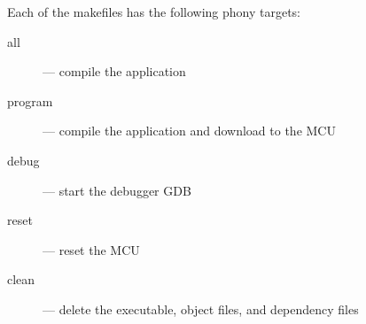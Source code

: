 Each of the makefiles has the following phony targets:
%
\begin{description}
\item[all]  --- compile the application
\item[program] --- compile the application and download to the MCU
\item[debug] --- start the debugger GDB
\item[reset] --- reset the MCU
\item[clean] --- delete the executable, object files, and dependency files
\end{description}
